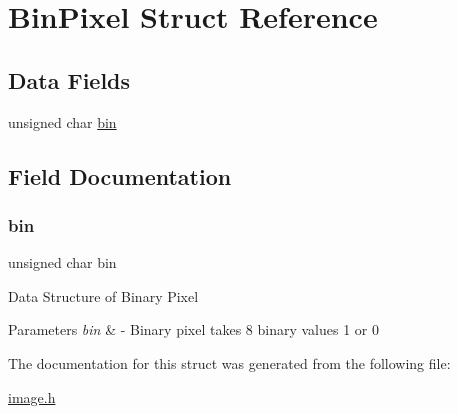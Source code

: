 \hypertarget{struct_bin_pixel}{}\section{Bin\+Pixel Struct Reference}
\label{struct_bin_pixel}
\subsection*{Data Fields}
\begin{DoxyCompactItemize}
\item 
unsigned char \hyperlink{struct_bin_pixel_a28531b082db12f4dbb6bf13a40cc43f2}{bin}
\end{DoxyCompactItemize}


\subsection{Field Documentation}
\mbox{\label{struct_bin_pixel_a28531b082db12f4dbb6bf13a40cc43f2}} 
\subsubsection{\texorpdfstring{bin}{bin}}
{\footnotesize\ttfamily unsigned char bin}

Data Structure of Binary Pixel 
\begin{DoxyParams}{Parameters}
{\em bin} & -\/ Binary pixel takes 8 binary values 1 or 0 \\
\hline
\end{DoxyParams}


The documentation for this struct was generated from the following file\+:\begin{DoxyCompactItemize}
\item 
\hyperlink{image_8h}{image.\+h}\end{DoxyCompactItemize}
